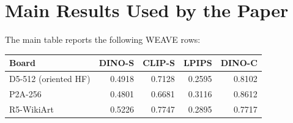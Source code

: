 \documentclass[10pt,twocolumn]{article}
\newcommand{\weave}{WEAVE}
\newcommand{\dinos}{DINO-S}
\newcommand{\dinoc}{DINO-C}
\newcommand{\clips}{CLIP-S}
\begin{document}
\section{Main Results Used by the Paper}

The main table reports the following \weave{} rows:

\begin{center}
\begin{tabular}{lrrrr}
\toprule
Board & \dinos{} & \clips{} & LPIPS & \dinoc{} \\
\midrule
D5-512 (oriented HF) & 0.4918 & 0.7128 & 0.2595 & 0.8102 \\
P2A-256 & 0.4801 & 0.6681 & 0.3116 & 0.8612 \\
R5-WikiArt & 0.5226 & 0.7747 & 0.2895 & 0.7717 \\
\bottomrule
\end{tabular}
\end{center}
\end{document}
